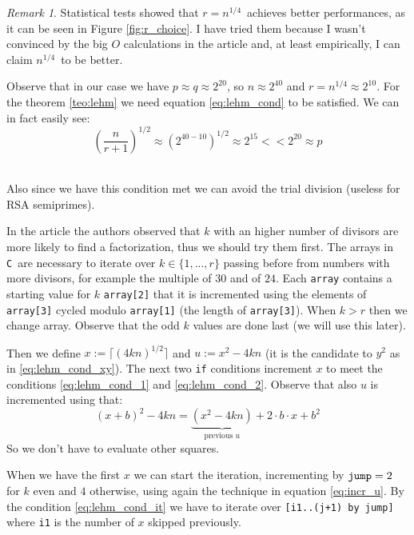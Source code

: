 \documentclass{article}
\theoremstyle{plain}
\theoremstyle{remark}
\newtheorem{rem}{Remark}
\theoremstyle{definition}
\begin{document}
\begin{rem}
	Statistical tests showed that $r = n^{1/4}$ achieves better performances, as it can be seen in Figure \ref{fig:r_choice}. I have tried them because I wasn't convinced by the big $O$ calculations in the article and, at least empirically, I can claim $n^{1/4}$ to be better. 

	Observe that in our case we have $p \approx q \approx 2^{20}$, so $n\approx 2^{40}$ and $r = n^{1/4} \approx 2^{10}$. For the theorem \ref{teo:lehm} we need equation \ref{eq:lehm_cond} to be satisfied. We can in fact easily see:
	\begin{equation*}
		\left(\frac{n}{r+1}\right)^{1/2} \approx \left( 2^{40-10} \right)^{1/2} \approx 2^{15} << 2^{20} \approx p
	\end{equation*} 

	Also since we have this condition met we can avoid the trial division (useless for RSA semiprimes). 
\end{rem}


In the article the authors observed that $k$ with an higher number of divisors are more likely to find a factorization, thus we should try them first. 
The arrays in \texttt{C} are necessary to iterate over $k \in \{1,...,r\}$ passing before from numbers with more divisors, for example the multiple of $30$ and of $24$. Each \verb|array| contains a starting value for $k$ \verb|array[2]| that it is incremented using the elements of \verb|array[3]| cycled modulo \verb|array[1]| (the length of \verb|array[3]|). When $k > r$ then we change array. Observe that the odd $k$ values are done last (we will use this later). 

Then we define $x := \lceil (4kn)^{1/2}\rceil $ and $ u := x^2 - 4kn$ (it is the candidate to $y^2$ as in \ref{eq:lehm_cond_xy}). The next two \texttt{if} conditions increment $x$ to meet the conditions \ref{eq:lehm_cond_1} and \ref{eq:lehm_cond_2}. Observe that also $u$ is incremented using that:
\begin{equation}
	\label{eq:incr_u}
	(x+b)^2 - 4kn = \underbrace{(x^2 - 4kn)}_{\text{previous }u} + 2\cdot b \cdot x + b^2
\end{equation}
So we don't have to evaluate other squares. 

When we have the first $x$ we can start the iteration, incrementing by $\verb|jump| = 2$ for $k$ even and $4$ otherwise, using again the technique in equation \ref{eq:incr_u}. By the condition \ref{eq:lehm_cond_it} we have to iterate over \verb|[i1..(j+1) by jump]| where \verb|i1| is the number of $x$ skipped previously. 
\end{document}
